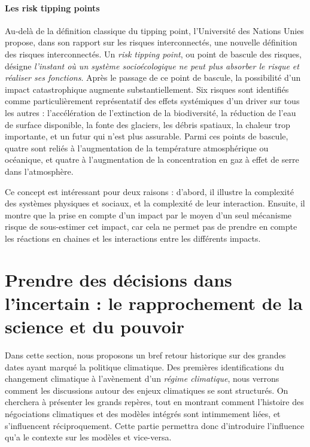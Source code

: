 \paragraph{Les risk tipping points}

Au-delà de la définition classique du tipping point, l'Université des Nations Unies propose, dans son rapport sur les risques interconnectés, une nouvelle définition des risques interconnectés. Un \textit{risk tipping point}, ou point de bascule des risques, désigne \textit{l'instant où un système socioécologique ne peut plus absorber le risque et réaliser ses fonctions}. Après le passage de ce point de bascule, la possibilité d'un impact catastrophique augmente substantiellement. Six risques sont identifiés comme particulièrement représentatif des effets systémiques d'un driver sur tous les autres : l'accélération de l'extinction de la biodiversité, la réduction de l'eau de surface disponible, la fonte des glaciers, les débris spatiaux, la chaleur trop importante, et un futur qui n'est plus assurable. Parmi ces points de bascule, quatre sont  reliés à l'augmentation de la température atmosphérique ou océanique, et quatre à l'augmentation de la concentration en gaz à effet de serre dans l'atmosphère. \cite{united_nations_university_-_institute_for_environment_and_human_security_unu-ehs_interconnected_2023}

Ce concept est intéressant pour deux raisons : d'abord, il illustre la complexité des systèmes physiques et sociaux, et la complexité de leur interaction. Ensuite, il montre que la prise en compte d'un impact par le moyen d'un seul mécanisme risque de sous-estimer cet impact, car cela ne permet pas de prendre en compte les réactions en chaines et les interactions entre les différents impacts. 

\section{Prendre des décisions dans l'incertain : le rapprochement de la science et du pouvoir}
\label{sect/1/2}

Dans cette section, nous proposons un bref retour historique sur des grandes dates ayant marqué la politique climatique. Des premières identifications du changement climatique à l'avènement d'un \emph{régime climatique}, nous verrons comment les discussions autour des enjeux climatiques se sont structurés. On cherchera à présenter les grands repères, tout en montrant comment l'histoire des négociations climatiques et des modèles intégrés sont intimmement liées, et s'influencent réciproquement. Cette partie permettra donc d'introduire l'influence qu'a le contexte sur les modèles et vice-versa. 

